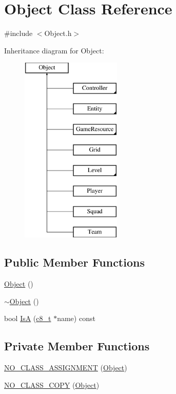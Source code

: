 \section{Object Class Reference}
\label{class_object}


{\ttfamily \#include $<$Object.\-h$>$}

Inheritance diagram for Object\-:\begin{figure}[H]
\begin{center}
\leavevmode
\includegraphics[height=9.000000cm]{class_object}
\end{center}
\end{figure}
\subsection*{Public Member Functions}
\begin{DoxyCompactItemize}
\item 
\hyperlink{class_object_a40860402e64d8008fb42329df7097cdb}{Object} ()
\item 
\hyperlink{class_object_ae8f5483f459e46687bd01e6f9977afd3}{$\sim$\-Object} ()
\item 
bool \hyperlink{class_object_a96008e0a25aaaf43c388afdb1e47e856}{Is\-A} (\hyperlink{types_8h_a93d4fa6fb79d31926edb1d51e2f502d2}{c8\-\_\-t} $\ast$name) const 
\end{DoxyCompactItemize}
\subsection*{Private Member Functions}
\begin{DoxyCompactItemize}
\item 
\hyperlink{class_object_a21a4305dfd66e83e5922af2ad4323a36}{N\-O\-\_\-\-C\-L\-A\-S\-S\-\_\-\-A\-S\-S\-I\-G\-N\-M\-E\-N\-T} (\hyperlink{class_object}{Object})
\item 
\hyperlink{class_object_aa378c4670d477843432d1cdb776d265a}{N\-O\-\_\-\-C\-L\-A\-S\-S\-\_\-\-C\-O\-P\-Y} (\hyperlink{class_object}{Object})
\end{DoxyCompactItemize}


